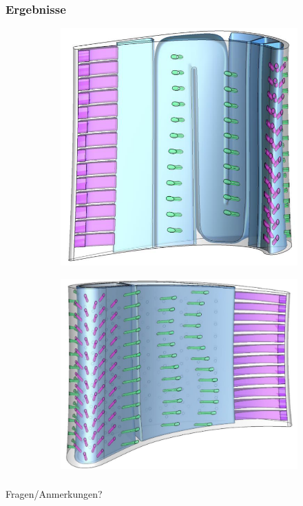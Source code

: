 \documentclass[8pt, aspectratio=169]{beamer}
\begin{document}
\begin{frame}
	\frametitle{Ergebnisse}
	\vspace{-1cm}\hspace{-0.5cm}
	\begin{figure}
		\centering
		\begin{subfigure}[t]{.49\textwidth}
			\centering
			\includegraphics[height=.6\textheight]{../tec/complete/18.png}
		\end{subfigure}
		\begin{subfigure}[t]{.49\textwidth}
			\centering
			\includegraphics[height=.6\textheight]{../tec/complete/17.png}
		\end{subfigure}
	\end{figure}
	\vfill
\end{frame}

\begin{frame}
	\frametitle{}
	\begin{minipage}[t]{\textwidth}
		\centering
		\Large Fragen/Anmerkungen?
	\end{minipage}
\end{frame}
\end{document}

